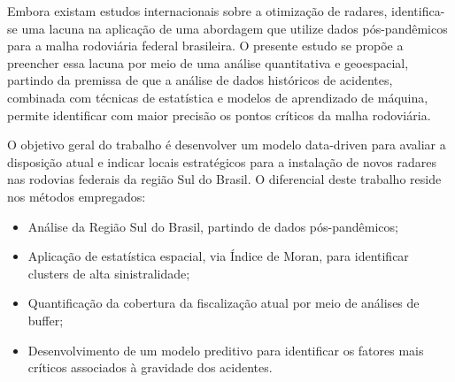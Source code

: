 \documentclass[12pt]{article}
\begin{document}

Embora existam estudos internacionais sobre a otimização de radares, identifica-se uma lacuna na aplicação de uma abordagem que utilize dados pós-pandêmicos para a malha rodoviária federal brasileira.
O presente estudo se propõe a preencher essa lacuna por meio de uma análise quantitativa e geoespacial, partindo da premissa de que a análise de dados históricos de acidentes, combinada com técnicas de estatística e modelos de aprendizado de máquina, permite identificar com maior precisão os pontos críticos da malha rodoviária.


O objetivo geral do trabalho é desenvolver um modelo data-driven para avaliar a disposição atual e indicar locais estratégicos para a instalação de novos radares nas rodovias federais da região Sul do Brasil. 
O diferencial deste trabalho reside nos métodos empregados: 
\begin{itemize}
    \item 
    Análise da Região Sul do Brasil, partindo de dados pós-pandêmicos;
    \item 
    Aplicação de estatística espacial, via Índice de Moran, para identificar clusters de alta sinistralidade; 
    \item 
    Quantificação da cobertura da fiscalização atual por meio de análises de buffer;
    \item 
    Desenvolvimento de um modelo preditivo para identificar os fatores mais críticos associados à gravidade dos acidentes. 
\end{itemize}
\end{document}
